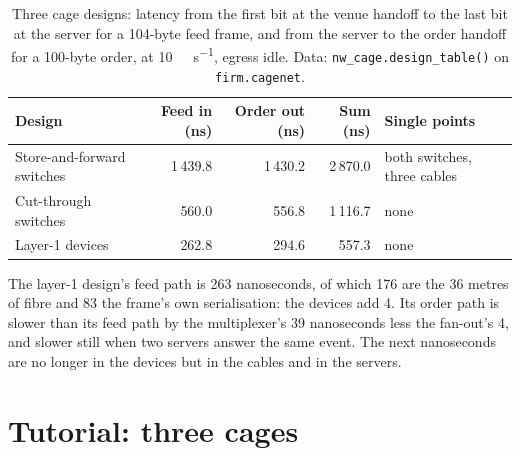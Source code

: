 \begin{table}[ht]
\centering\small
\begin{tabular}{lrrrl}
\toprule
Design & Feed in (ns) & Order out (ns) & Sum (ns) & Single points \\
\midrule
Store-and-forward switches & 1\,439.8 & 1\,430.2 & 2\,870.0 & both switches, three cables \\
Cut-through switches & 560.0 & 556.8 & 1\,116.7 & none \\
Layer-1 devices & 262.8 & 294.6 & 557.3 & none \\
\bottomrule
\end{tabular}
\caption{Three cage designs: latency from the first bit at the venue handoff to the last bit at the server for a 104-byte feed
frame, and from the server to the order handoff for a 100-byte order, at \qty{10}{\giga\bit\per\second}, egress idle. Data:
\texttt{nw\_cage.design\_table()} on \texttt{firm.cagenet}.}\label{tab:nw:switches-and-layer-1-devices:designs}
\end{table}

The layer-1 design's feed path is 263 nanoseconds, of which 176 are the 36 metres of fibre and 83 the frame's own
serialisation: the devices add 4. Its order path is slower than its feed path by the multiplexer's 39 nanoseconds less the
fan-out's 4, and slower still when two servers answer the same event. The next nanoseconds are no longer in the devices but in
the cables and in the servers.

\section{Tutorial: three cages}\label{tut:nw:switches-and-layer-1-devices:tut}

